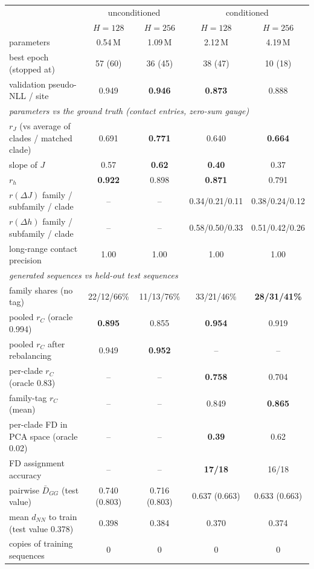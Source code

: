 \begin{center}\footnotesize
\begin{tabular}{lcccc}
\toprule
 & \multicolumn{2}{c}{unconditioned} & \multicolumn{2}{c}{conditioned}\\
 & $H=128$ & $H=256$ & $H=128$ & $H=256$\\
\midrule
parameters & 0.54\,M & 1.09\,M & 2.12\,M & 4.19\,M\\
best epoch (stopped at) & 57 (60) & 36 (45) & 38 (47) & 10 (18)\\
validation pseudo-NLL / site & 0.949 & \textbf{0.946} & \textbf{0.873} & 0.888\\
\midrule
\multicolumn{5}{l}{\emph{parameters vs the ground truth (contact entries, zero-sum gauge)}}\\
$r_J$ (vs average of clades / matched clade) & 0.691 & \textbf{0.771} & 0.640 & \textbf{0.664}\\
slope of $J$ & 0.57 & \textbf{0.62} & \textbf{0.40} & 0.37\\
$r_h$ & \textbf{0.922} & 0.898 & \textbf{0.871} & 0.791\\
$r(\Delta J)$ family / subfamily / clade & -- & -- & 0.34/0.21/0.11 & 0.38/0.24/0.12\\
$r(\Delta h)$ family / subfamily / clade & -- & -- & 0.58/0.50/0.33 & 0.51/0.42/0.26\\
long-range contact precision & 1.00 & 1.00 & 1.00 & 1.00\\
\midrule
\multicolumn{5}{l}{\emph{generated sequences vs held-out test sequences}}\\
family shares (no tag) & 22/12/66\% & 11/13/76\% & 33/21/46\% & \textbf{28/31/41\%}\\
pooled $r_C$ (oracle 0.994) & \textbf{0.895} & 0.855 & \textbf{0.954} & 0.919\\
pooled $r_C$ after rebalancing & 0.949 & \textbf{0.952} & -- & --\\
per-clade $r_C$ (oracle 0.83) & -- & -- & \textbf{0.758} & 0.704\\
family-tag $r_C$ (mean) & -- & -- & 0.849 & \textbf{0.865}\\
per-clade FD in PCA space (oracle 0.02) & -- & -- & \textbf{0.39} & 0.62\\
FD assignment accuracy & -- & -- & \textbf{17/18} & 16/18\\
pairwise $\bar D_{GG}$ (test value) & 0.740 (0.803) & 0.716 (0.803) & 0.637 (0.663) & 0.633 (0.663)\\
mean $d_{NN}$ to train (test value 0.378) & 0.398 & 0.384 & 0.370 & 0.374\\
copies of training sequences & 0 & 0 & 0 & 0\\
\bottomrule
\end{tabular}
\end{center}

